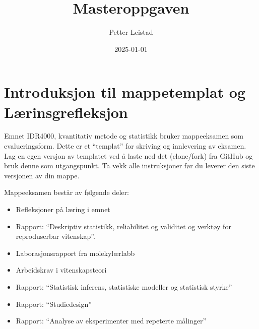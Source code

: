 \documentclass[
  letterpaper,
  DIV=11,
  numbers=noendperiod]{scrreprt}
\title{Masteroppgaven}
\author{Petter Leistad}
\date{2025-01-01}
\providecommand{\tightlist}{%
  \setlength{\itemsep}{0pt}\setlength{\parskip}{0pt}}\usepackage{longtable,booktabs,array}
\renewcommand*\contentsname{Table of contents}
\newcommand\contentsname{Table of contents}
\begin{document}
\maketitle
\ifdefined\Shaded\renewenvironment{Shaded}{\begin{tcolorbox}[breakable, sharp corners, interior hidden, enhanced, boxrule=0pt, frame hidden, borderline west={3pt}{0pt}{shadecolor}]}{\end{tcolorbox}}\fi

\renewcommand*\contentsname{Table of contents}
{
\hypersetup{linkcolor=}
\setcounter{tocdepth}{2}
\tableofcontents
}

\hypertarget{introduksjon-til-mappetemplat-og-luxe6rinsgrefleksjon}{%
\chapter*{Introduksjon til mappetemplat og
Lærinsgrefleksjon}\label{introduksjon-til-mappetemplat-og-luxe6rinsgrefleksjon}}


Emnet IDR4000, kvantitativ metode og statistikk bruker mappeeksamen som
evalueringsform. Dette er et ``templat'' for skriving og innlevering av
eksamen. Lag en egen versjon av templatet ved å laste ned det
(clone/fork) fra GitHub og bruk denne som utgangspunkt. Ta vekk alle
instruksjoner før du leverer den siste versjonen av din mappe.

Mappeeksamen består av følgende deler:

\begin{itemize}
\tightlist
\item
  Refleksjoner på læring i emnet
\item
  Rapport: ``Deskriptiv statistikk, reliabilitet og validitet og verktøy
  for reproduserbar vitenskap''.
\item
  Laborasjonsrapport fra molekylærlabb
\item
  Arbeidskrav i vitenskapsteori
\item
  Rapport: ``Statistisk inferens, statistiske modeller og statistisk
  styrke''
\item
  Rapport: ``Studiedesign''
\item
  Rapport: ``Analyse av eksperimenter med repeterte målinger''
\end{itemize}
\end{document}
